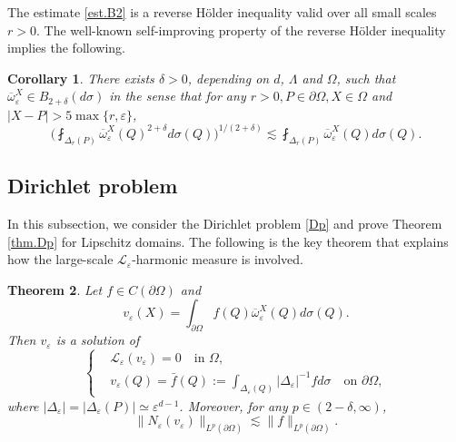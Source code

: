 \documentclass[reqno,12pt]{amsart} %
\newtheorem{theorem}{Theorem}[section]
\newtheorem{corollary}[theorem]{Corollary}
\theoremstyle{definition}
\theoremstyle{remark}
\numberwithin{equation}{section}
\newcommand{\cL}{\mathcal{L}}
\newcommand{\e}{\varepsilon}
\begin{document}
The estimate \eqref{est.B2} is a reverse H\"{o}lder inequality valid over all small scales $r>0$. The well-known  self-improving property of the reverse H\"{o}lder inequality implies the following.
\begin{corollary}\label{coro.2+delta}
    There exists $\delta>0$, depending on $d$, $\Lambda$ and $\Omega$, such that $\overline{\omega}_\e^X \in B_{2+\delta}(d\sigma)$ in the sense that for any $r>0, P\in \partial \Omega, X\in \Omega$ and $|X - P| > 5\max \{r, \e\}$,
    \begin{equation}
        \bigg( \fint_{\Delta_r(P)} \overline{\omega}_\e^X(Q)^{2+\delta} d\sigma(Q) \bigg)^{1/(2+\delta)} \lesssim \fint_{\Delta_{r}(P)} \overline{\omega}_\e^X(Q) d\sigma(Q).
    \end{equation}
\end{corollary}

\subsection{Dirichlet problem}

In this subsection, we consider the Dirichlet problem \eqref{Dp} and prove Theorem \ref{thm.Dp} for Lipschitz domains. The following is the key theorem that explains how the large-scale $\cL_\e$-harmonic measure is involved.

\begin{theorem}\label{thm.Neve<f}
    Let $f\in C(\partial \Omega)$ and
    \begin{equation}\label{def.ve}
        v_\e(X) = \int_{\partial \Omega} f(Q) \overline{\omega}^X_\e(Q) d\sigma(Q).
    \end{equation}
    Then $v_\e$ is a solution of
    \begin{equation}\label{eq.ve=barf}
    \left\{
    \begin{aligned}
        & \cL_\e(v_\e) = 0 \quad \text{in } \Omega, \\
        & v_\e(Q) = \bar{f}(Q) := \int_{\Delta_\e(Q)} |\Delta_\e|^{-1} f d\sigma \quad \text{on } \partial \Omega,
    \end{aligned}
    \right.
\end{equation}
where $|\Delta_\e| = |\Delta_\e(P)| \simeq \e^{d-1}$.
    Moreover, for any $p\in (2-\delta, \infty)$,
    \begin{equation}\label{est.Neve}
        \| N_\e(v_\e) \|_{L^p(\partial \Omega)} \lesssim \| f \|_{L^p(\partial \Omega)}.
    \end{equation}
\end{theorem}
\end{document}
